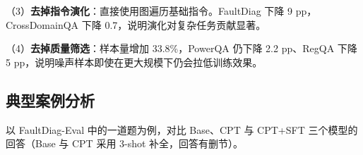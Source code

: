 \documentclass[fontset=fandol,type=master,campus=shenzhen,etitleauto=true]{hithesisbook}
\begin{document}
（3）\textbf{去掉指令演化}：直接使用图遍历基础指令。FaultDiag 下降 9 pp，CrossDomainQA 下降 0.7，说明演化对复杂任务贡献显著。

（4）\textbf{去掉质量筛选}：样本量增加 33.8\%，PowerQA 仍下降 2.2 pp、RegQA 下降 5 pp，说明噪声样本即使在更大规模下仍会拉低训练效果。

\begin{table}[htbp]
\centering
\caption{SFT数据合成管线消融实验结果}
\label{tab:sft-ablation}
\small
{}
\end{table}

\subsection{典型案例分析}\label{subsec:sft-case}

以 FaultDiag-Eval 中的一道题为例，对比 Base、CPT 与 CPT+SFT 三个模型的回答（Base 与 CPT 采用 3-shot 补全，回答有删节）。
\end{document}
